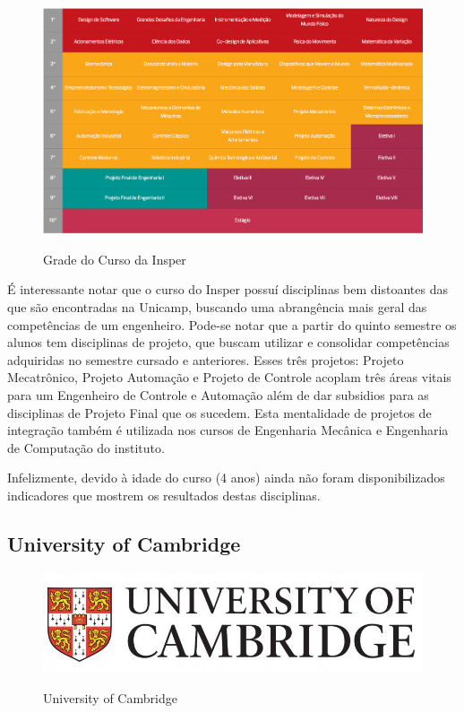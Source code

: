 \documentclass[12pt]{article} %
\begin{document}
\begin{figure}[H]
\centering
\includegraphics[scale=0.25]{pictures/gradeInsper.png}\\
\caption{Grade do Curso da Insper}
\end{figure}

É interessante notar que o curso do Insper possuí disciplinas bem distoantes das que são encontradas na Unicamp, buscando uma abrangência mais geral das competências de um engenheiro. Pode-se notar que a partir do quinto semestre os alunos tem disciplinas
de projeto, que buscam utilizar e consolidar competências adquiridas no semestre cursado e anteriores. Esses três projetos: Projeto Mecatrônico, Projeto Automação e Projeto de Controle acoplam três áreas vitais para um Engenheiro de Controle e Automação
além de dar subsidios para as disciplinas de Projeto Final que os sucedem. Esta mentalidade de projetos de integração também é utilizada nos cursos de Engenharia Mecânica e Engenharia de Computação do instituto. 

Infelizmente, devido à idade do curso (4 anos) ainda não foram disponibilizados indicadores que mostrem os resultados destas disciplinas.



\subsection{University of Cambridge}

\begin{figure}[H]
\centering
\includegraphics[scale=0.3]{pictures/logoCambridge.jpg}\\
\caption{University of Cambridge}
\end{figure}
\end{document}
